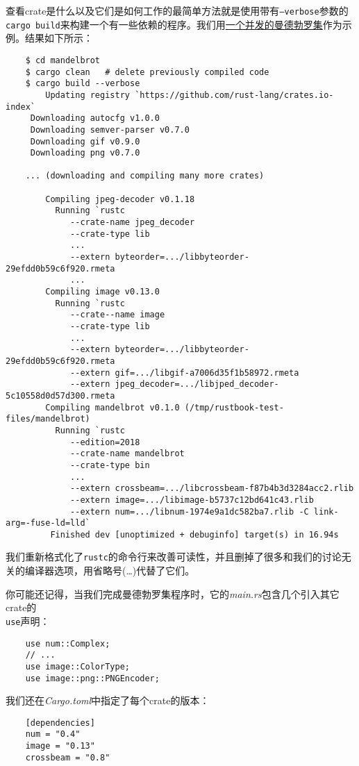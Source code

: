 查看crate是什么以及它们是如何工作的最简单方法就是使用带有\texttt{--verbose}参数的\texttt{cargo build}来构建一个有一些依赖的程序。我们用\hyperref[mandelbrot]{一个并发的曼德勃罗集}作为示例。结果如下所示：
\begin{verbatim}
    $ cd mandelbrot
    $ cargo clean   # delete previously compiled code
    $ cargo build --verbose
        Updating registry `https://github.com/rust-lang/crates.io-index`
     Downloading autocfg v1.0.0
     Downloading semver-parser v0.7.0
     Downloading gif v0.9.0
     Downloading png v0.7.0
    
    ... (downloading and compiling many more crates)

        Compiling jpeg-decoder v0.1.18
          Running `rustc
             --crate-name jpeg_decoder
             --crate-type lib
             ...
             --extern byteorder=.../libbyteorder-29efdd0b59c6f920.rmeta
             ...
        Compiling image v0.13.0
          Running `rustc
             --crate--name image
             --crate-type lib
             ...
             --extern byteorder=.../libbyteorder-29efdd0b59c6f920.rmeta
             --extern gif=.../libgif-a7006d35f1b58972.rmeta
             --extern jpeg_decoder=.../libjped_decoder-5c10558d0d57d300.rmeta
        Compiling mandelbrot v0.1.0 (/tmp/rustbook-test-files/mandelbrot)
          Running `rustc
             --edition=2018
             --crate-name mandelbrot
             --crate-type bin
             ...
             --extern crossbeam=.../libcrossbeam-f87b4b3d3284acc2.rlib
             --extern image=.../libimage-b5737c12bd641c43.rlib
             --extern num=.../libnum-1974e9a1dc582ba7.rlib -C link-arg=-fuse-ld=lld`
         Finished dev [unoptimized + debuginfo] target(s) in 16.94s
\end{verbatim}

我们重新格式化了\texttt{rustc}的命令行来改善可读性，并且删掉了很多和我们的讨论无关的编译器选项，用省略号(\ldots)代替了它们。

你可能还记得，当我们完成曼德勃罗集程序时，它的\emph{main.rs}包含几个引入其它crate的\\
\texttt{use}声明：
\begin{verbatim}
    use num::Complex;
    // ...
    use image::ColorType;
    use image::png::PNGEncoder;
\end{verbatim}

我们还在\emph{Cargo.toml}中指定了每个crate的版本：
\begin{verbatim}
    [dependencies]
    num = "0.4"
    image = "0.13"
    crossbeam = "0.8"
\end{verbatim}

